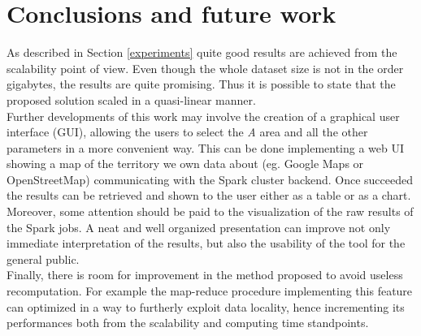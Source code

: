 \documentclass{sig-alternate-05-2015}
\begin{document}
\section{Conclusions and future work}
As described in Section \ref{experiments} quite good results are achieved from the scalability point of view. Even though the whole dataset size is not in the order gigabytes, the results are quite promising. Thus it is possible to state that the proposed solution scaled in a quasi-linear manner.\\
Further developments of this work may involve the creation of a graphical user interface (GUI), allowing the users to select the \emph{A} area and all the other parameters in a more convenient way. This can be done implementing a web UI showing a map of the territory we own data about (eg. Google Maps or OpenStreetMap) communicating with the Spark cluster backend. Once succeeded the results can be retrieved and shown to the user either as a table or as a chart.\\
Moreover, some attention should be paid to the visualization of the raw results of the Spark jobs. A neat and well organized presentation can improve not only immediate interpretation of the results, but also the usability of the tool for the general public.\\
Finally, there is room for improvement in the method proposed to avoid useless recomputation. For example the map-reduce procedure implementing this feature can optimized in a way to furtherly exploit data locality, hence incrementing its performances both from the scalability and computing time standpoints.

%



%
%
\end{document}
